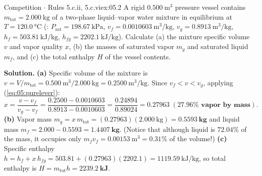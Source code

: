\begin{workedexample}{Competition $\cdot$ Rules 5.c.ii, 5.c.vi}{ex:05.2}
A rigid $\SI{0.500}{\cubic\meter}$ pressure vessel contains $m_{\mathrm{tot}} = \SI{2.000}{\kilogram}$ of a two-phase liquid--vapor water mixture in equilibrium at $T = \SI{120.0}{\celsius}$ (: $P_{\mathrm{sat}} = \SI{198.67}{\kilo\pascal}$, $v_f = \SI{0.0010603}{\cubic\meter\per\kilogram}$, $v_g = \SI{0.8913}{\cubic\meter\per\kilogram}$, $h_f = \SI{503.81}{\kilo\joule\per\kilogram}$, $h_{fg} = \SI{2202.1}{\kilo\joule\per\kilogram}$). Calculate (a) the mixture specific volume $v$ and vapor quality $x$, (b) the masses of saturated vapor $m_g$ and saturated liquid $m_f$, and (c) the total enthalpy $H$ of the vessel contents.

\textbf{Solution.}
\textbf{(a)} Specific volume of the mixture is $v = V/m_{\mathrm{tot}} = \SI{0.500}{\cubic\meter}/\SI{2.000}{\kilogram} = \SI{0.2500}{\cubic\meter\per\kilogram}$. Since $v_f < v < v_g$, applying (\ref{eq:05:purelever}):
\[
  x = \frac{v - v_f}{v_g - v_f} = \frac{0.2500 - 0.0010603}{0.8913 - 0.0010603} = \frac{0.24894}{0.89024} = \mathbf{0.27963\;(27.96\%\text{ vapor by mass})}.
\]
\textbf{(b)} Vapor mass $m_g = x\,m_{\mathrm{tot}} = (0.27963)(\SI{2.000}{\kilogram}) = \mathbf{\SI{0.5593}{\kilogram}}$ and liquid mass $m_f = 2.000 - 0.5593 = \mathbf{\SI{1.4407}{\kilogram}}$. (Notice that although liquid is $72.04\%$ of the mass, it occupies only $m_f v_f = \SI{0.00153}{\cubic\meter} = 0.31\%$ of the volume!)
\textbf{(c)} Specific enthalpy $h = h_f + x\,h_{fg} = 503.81 + (0.27963)(2202.1) = \SI{1119.59}{\kilo\joule\per\kilogram}$, so total enthalpy is $H = m_{\mathrm{tot}}h = \mathbf{\SI{2239.2}{\kilo\joule}}$.
\end{workedexample}

